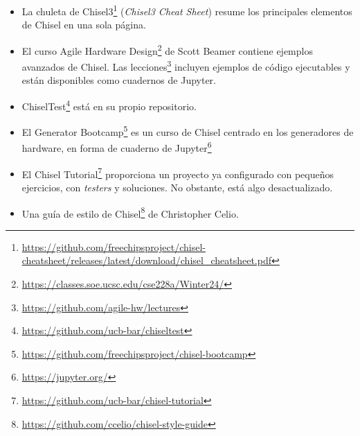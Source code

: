 \documentclass[%
    10pt,
    headinclude, footinclude=false,
    openright, %
    notitlepage,
    cleardoublepage=empty,
    headsepline,
    numbers=noenddot,
    bibliography=totoc, index=totoc,
    ]{scrbook}
\newcommand{\myref}[2]{\href{#1}{#2}}
\renewcommand{\myref}[2]{{#2}{\footnote{\url{#1}}}}
\begin{document}
\begin{itemize}
\item La \myref{https://github.com/freechipsproject/chisel-cheatsheet/releases/latest/download/chisel_cheatsheet.pdf}{chuleta de Chisel3} (\emph{Chisel3 Cheat Sheet}) resume los principales elementos de Chisel en una sola página.


\item El curso \myref{https://classes.soe.ucsc.edu/cse228a/Winter24/}{Agile Hardware Design} de Scott Beamer
contiene ejemplos avanzados de Chisel. Las \myref{https://github.com/agile-hw/lectures}{lecciones}
incluyen ejemplos de código ejecutables y están disponibles como cuadernos de Jupyter.

\item \myref{https://github.com/ucb-bar/chiseltest}{ChiselTest} está en
su propio repositorio.


\item El \myref{https://github.com/freechipsproject/chisel-bootcamp}{Generator Bootcamp} es
un curso de Chisel centrado en los generadores de hardware, en forma de cuaderno de \myref{https://jupyter.org/}{Jupyter}


\item El \myref{https://github.com/ucb-bar/chisel-tutorial}{Chisel Tutorial} proporciona un proyecto ya
configurado con pequeños ejercicios, con \emph{testers} y soluciones. No obstante, está algo desactualizado.

\item Una \myref{https://github.com/ccelio/chisel-style-guide}{guía de estilo de Chisel} de Christopher Celio.

\end{itemize}
\end{document}
